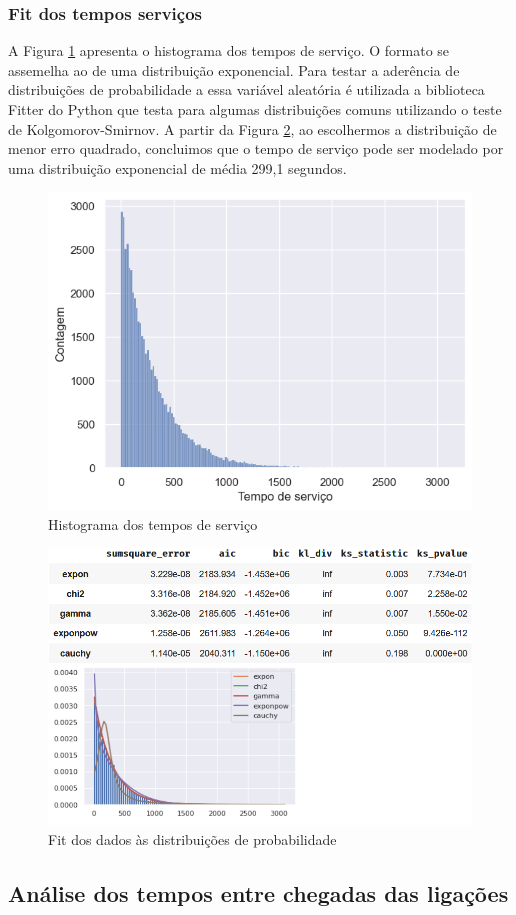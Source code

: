 \subsubsection{Fit dos tempos serviços}
A Figura \ref*{fig: hist-servicos} apresenta o histograma dos tempos de serviço. O formato se assemelha ao de uma distribuição exponencial. Para testar a aderência de distribuições de probabilidade a essa variável aleatória é utilizada a biblioteca Fitter do Python que testa para algumas distribuições comuns utilizando o teste de Kolgomorov-Smirnov. A partir da Figura \ref*{fig: fit-servicos}, ao escolhermos a distribuição de menor erro quadrado, concluimos que o tempo de serviço pode ser modelado por uma distribuição exponencial de média 299,1 segundos.

\begin{figure}[H]
    \includegraphics{analise-de-dados/anual/histograma-servicos.png}
    \caption{Histograma dos tempos de serviço}
    \label{fig: hist-servicos}
\end{figure}

\begin{figure}[H]
    \includegraphics[scale=.9]{analise-de-dados/anual/fit-servicos.png}
    \caption{Fit dos dados às distribuições de probabilidade}
    \label{fig: fit-servicos}
\end{figure}

\subsection{Análise dos tempos entre chegadas das ligações}
